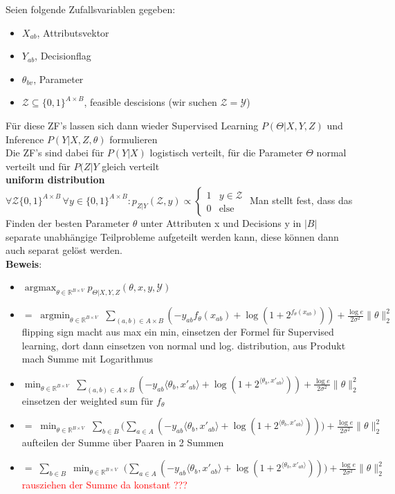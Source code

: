 \documentclass[12pt,a4paper]{article}
\DeclareMathOperator*{\argmin}{argmin}
\DeclareMathOperator*{\argmax}{argmax}
\newcommand{\nl}{\\[0.1cm]}
\newcommand{\red}[1]{\textcolor{red} {#1}}
\begin{document}
Seien folgende Zufallsvariablen gegeben:
\begin{itemize}
\item $X_{ab}$, Attributsvektor
\item $Y_{ab}$, Decisionflag
\item $\theta_{bv}$, Parameter
\item $\mathcal{Z}\subseteq \{0,1\}^{A\times B}$, feasible descisions (wir suchen $\mathcal{Z} = \mathcal{Y}$)
\end{itemize}
Für diese ZF's lassen sich dann wieder Supervised Learning $P(\Theta|X,Y,Z)$ und Inference $P(Y|X,Z,\theta)$ formulieren\nl
Die ZF's sind dabei für $P(Y|X)$ logistisch verteilt, für die Parameter $\Theta$ normal verteilt und für $P(Z|Y$ gleich verteilt\nl
\textbf{uniform distribution}\\
$\displaystyle \forall \mathcal{Z} \{0,1\}^{A\times B} \, \forall y \in \{0,1\}^{A\times B}: p_{Z|Y}(\mathcal{Z},y) \propto \begin{cases} 1 & y\in \mathcal{Z}\\0 & \text{else} \end{cases}$
Man stellt fest, dass das Finden der besten Parameter $\theta$ unter Attributen x und Decisions y in $|B|$ separate unabhängige Teilprobleme aufgeteilt werden kann, diese können dann auch separat gelöst werden.\\
\textbf{Beweis}:
\begin{itemize}
\item $\displaystyle \argmax_{\theta \in \mathbb{R}^{B\times V}} p_{\Theta |X,Y,Z}(\theta,x,y,\mathcal{Y})$
\item $\displaystyle =\; \argmin_{\theta \in \mathbb{R}^{B\times V}} \; \sum_{(a,b)\in A\times B} (-y_{ab} f_\theta(x_{ab}) + \log (1+2^{f_\theta(x_{ab})}))+ \frac{\log e}{2\sigma^2} \| \theta \|^2_2$\\
flipping sign macht aus max ein min, einsetzen der Formel für Supervised learning, dort dann einsetzen von normal und log. distribution, aus Produkt mach Summe mit Logarithmus
\item $\displaystyle \min_{\theta \in \mathbb{R}^{B\times V}} \; \sum_{(a,b)\in A\times B} (-y_{ab} \langle \theta_b, x'_{ab} \rangle + \log (1+2^{\langle \theta_b, x'_{ab} \rangle}))+ \frac{\log e}{2\sigma^2} \| \theta \|^2_2$\\
einsetzen der weighted sum für $f_\theta$
\item $\displaystyle =\; \min_{\theta \in \mathbb{R}^{B\times V}} \;  \sum_{b\in B} \big(\sum_{a\in A}  (-y_{ab} \langle \theta_b, x'_{ab} \rangle + \log (1+2^{\langle \theta_b, x'_{ab} \rangle})) \big)+ \frac{\log e}{2\sigma^2} \| \theta \|^2_2$\\
aufteilen der Summe über Paaren in 2 Summen
\item $\displaystyle =\; \sum_{b\in B} \; \min_{\theta \in \mathbb{R}^{B\times V}} \;   \big(\sum_{a\in A}  (-y_{ab} \langle \theta_b, x'_{ab} \rangle + \log (1+2^{\langle \theta_b, x'_{ab} \rangle})) \big)+ \frac{\log e}{2\sigma^2} \| \theta \|^2_2$\\
\red{rausziehen der Summe da konstant ???}
\end{itemize}
\end{document}
